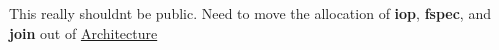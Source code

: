 
\begin{DoxyRefList}
\item[Member \mbox{\hyperlink{classAddrSpaceManager_a89658bd677414a271a918f0f37af0bd6}{Addr\+Space\+Manager::insert\+Space}} (\mbox{\hyperlink{classAddrSpace}{Addr\+Space}} $\ast$spc)]\label{todo__todo000001}%
%
This really shouldn\textquotesingle{}t be public. Need to move the allocation of {\bfseries{iop}}, {\bfseries{fspec}}, and {\bfseries{join}} out of \mbox{\hyperlink{classArchitecture}{Architecture}} 
\end{DoxyRefList}